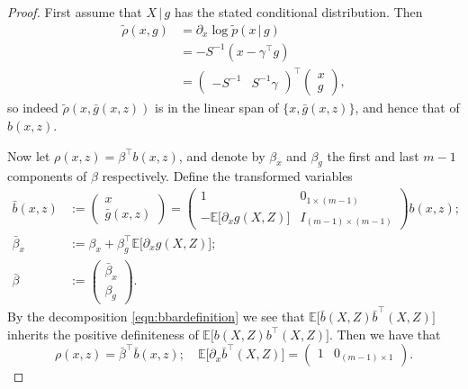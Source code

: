 \documentclass[aos]{imsart}
\newcommand{\E}{\mathbb{E}}
\newcommand{\given}{\,|\,}
\begin{document}
	\begin{proof}
		First assume that $X\given  g$ has the stated conditional distribution. Then
		\begin{align*}
			\tilde \rho(x,g) &= \partial_x \log \tilde p(x\given  g)\\
			&= -S^{-1}(x - \gamma^{\top}g)\\
			&= \begin{pmatrix}
				-S^{-1} & S^{-1} \gamma
			\end{pmatrix}^{\top} \begin{pmatrix}
				x \\ g
			\end{pmatrix},
		\end{align*}
		so indeed $\tilde \rho(x,\bar g(x,z))$ is in the linear span of $\{x,\bar g(x,z)\}$, and hence that of $b(x,z)$.
		
		Now let $\rho(x,z)=\beta^{\top} b(x,z)$, and denote by $\beta_x$ and $\beta_g$ the first and last $m-1$ components of $\beta$ respectively. Define the transformed variables
		\begin{align}
			\bar b(x,z) &:= \begin{pmatrix}
				x\\\bar g(x,z)
			\end{pmatrix} = \begin{pmatrix}
				1 & 0_{1 \times (m-1)}\\
				- \E\big[ \partial_x g(X,Z)\big] & I_{(m-1)\times (m-1)}
			\end{pmatrix}b(x,z)\label{eqn:bbardefinition};\\
			\bar \beta_x &:= \beta_x +  \beta_g^{\top} \E\big[\partial_x g(X,Z)\big];\nonumber\\
			\bar \beta &:= \begin{pmatrix}
				\bar \beta_x \\ \beta_g
			\end{pmatrix}.\nonumber
		\end{align}
		By the decomposition \eqref{eqn:bbardefinition} we see that $\E\big[\bar b(X,Z) \bar b^{\top}(X,Z)\big]$ inherits the positive definiteness of $\E\big[ b(X,Z) b^{\top}(X,Z)\big]$. Then we have that
		\begin{equation*}
			\rho(x,z) = \bar\beta^{\top} \bar b(x,z);\quad 
			\E\big[ \partial_x \bar b^{\top}(X,Z)\big]=\begin{pmatrix}
				1 & 0_{(m-1)\times 1}
			\end{pmatrix}.\label{eqn:scorebasiscentering}
		\end{equation*}
		

\end{proof}
\end{document}
